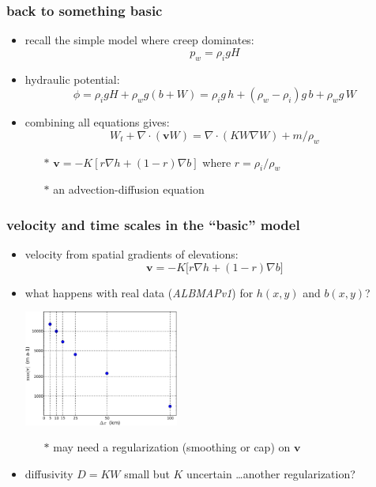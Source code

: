 \documentclass[hide notes,intlimits]{beamer}
\begin{document}
\begin{frame}
  \frametitle{back to something basic}

  \begin{itemize}
    \item recall the simple model where creep dominates:
    		$$p_w = \rho_i g H$$
    \item hydraulic potential:
      $$\phi = \rho_i g H + \rho_w g (b+W) = \rho_i g \,h + (\rho_w - \rho_i) g \,b + \rho_w g \,W$$
    \item combining all equations gives:
       $$\boxed{W_t + \nabla\cdot\left(\mathbf{v} W\right) = \nabla \cdot(K W \nabla W) + m / \rho_w}$$
      \begin{itemize}
      \vspace{-3mm}
      \item[$\ast$] $\mathbf{v} = - K \left[r \nabla h + (1-r) \nabla b\right]$  \quad where $r = \rho_i/\rho_w$
      \item[$\ast$] an advection-diffusion equation
      \end{itemize}
  \end{itemize}
\end{frame}


\begin{frame}
  \frametitle{velocity and time scales in the ``basic'' model}

  \begin{itemize}
    \item velocity from spatial gradients of elevations:
      $$\mathbf{v} = - K \Big[r \nabla h + (1-r) \nabla b\Big]$$
    \item what happens with real data (\emph{ALBMAPv1}) for $h(x,y)$ and $b(x,y)$?
    \begin{center}
    \medskip
     \qquad \includegraphics[width=0.4\textwidth]{figs/vresults}
    \medskip
    \end{center}
       \small
       \begin{itemize}
       \item[$\ast$] may need a regularization (smoothing or cap) on $\mathbf{v}$
       \end{itemize}
       \normalsize
    \item diffusivity $D = K W$ small but $K$ uncertain \dots another regularization?
  \end{itemize}

\end{frame}
\end{document}

